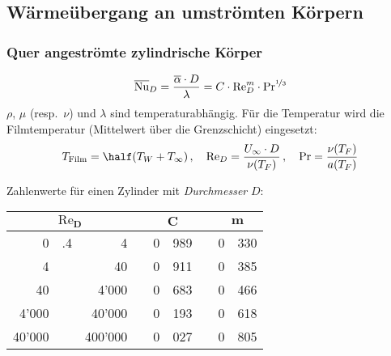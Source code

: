 	\subsection{Wärmeübergang an umströmten Körpern} %
		\subsubsection{Quer angeströmte zylindrische Körper} %
			\[
				\overline{\mathrm{Nu}}_D = \frac{\overline\alpha \cdot D}{\lambda} = C \cdot \mathrm{Re}_D^m \cdot \mathrm{Pr}^{\nicefrac 1 3}
			\]
			$\rho$, $\mu$ (resp.~$\nu$) und $\lambda$ sind temperaturabhängig. Für die Temperatur wird die Filmtemperatur (Mittelwert über die Grenzschicht) eingesetzt:
			\[
				T_\text{Film} = \half (T_W + T_\infty)\,,\quad \mathrm{Re}_D = \frac{U_\infty \cdot D}{\nu(T_F)}\,,\quad \mathrm{Pr} = \frac{\nu(T_F)}{a(T_F)}
			\]

			Zahlenwerte für einen Zylinder mit \emph{Durchmesser} $D$:
			\begin{center}
				\begin{tabular}{r@{}l@{$\:-\:$}rcr@{.}lcr@{.}l}
					\toprule
					\multicolumn{3}{c}{$\boldsymbol{\mathrm{Re}_D}$} && \multicolumn{2}{c}{$\boldsymbol C$} && \multicolumn{2}{c}{$\boldsymbol m$} \\
					\midrule
					     0 & .4 & 4       && 0 & 989 && 0 & 330 \\
					     4 &    & 40      && 0 & 911 && 0 & 385 \\
					    40 &    & 4'000   && 0 & 683 && 0 & 466 \\
					 4'000 &    & 40'000  && 0 & 193 && 0 & 618 \\
					40'000 &    & 400'000 && 0 & 027 && 0 & 805 \\
					\bottomrule
				\end{tabular}
			\end{center}

